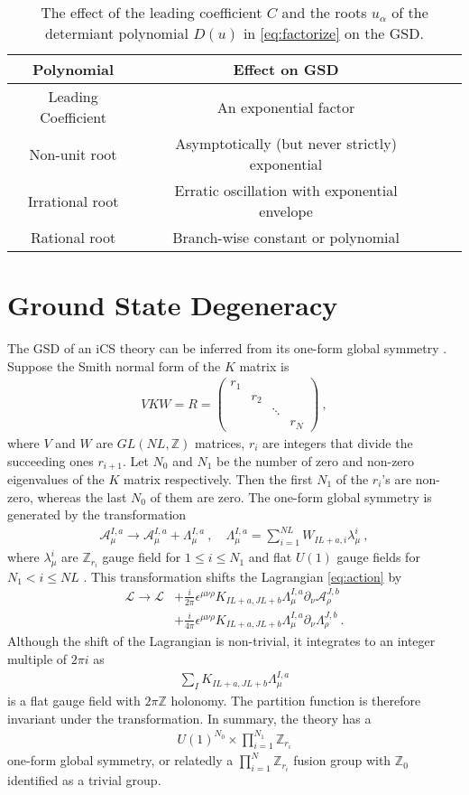 \documentclass[aps,prb,twocolumn,superscriptaddress,floatfix,10pt,nofootinbib]{revtex4-2}
\newcommand{\ie}{\begin{equation}\begin{aligned}}
\newcommand{\fe}{\end{aligned}\end{equation}}
\theoremstyle{definition}
\begin{document}
\begin{table*}
    \centering
    \begin{tabular}{|c|c|c|c|}
        \hline
        Polynomial & Effect on GSD
        \\
        \hline
        Leading Coefficient & An exponential factor
        \\
        \hline
        Non-unit root & Asymptotically (but never strictly) exponential
        \\
        \hline
        Irrational root & Erratic oscillation with exponential envelope 
        \\
        \hline
        Rational root & Branch-wise constant or polynomial
        \\
        \hline
    \end{tabular}
    \caption{The effect of the leading coefficient $C$ and the roots $u_\alpha$ of the determiant polynomial $D(u)$ in \eqref{eq:factorize} on the GSD.}
    \label{tab:GSD_iCS2}
\end{table*}

\section{Ground State Degeneracy}
\label{sec:GSD}
The GSD of an iCS theory can be inferred from its one-form global symmetry \cite{Gaiotto_2015}. Suppose the Smith normal form of the $K$ matrix is
\ie\label{eq:SNF}
VKW=R=\left(\begin{array}{cccccc}
     r_1&  \\
     & r_2 \\
     & & \ddots\\
     & & & r_{N}
\end{array}\right)~,
\fe
where $V$ and $W$ are $GL(NL,\mathbb{Z})$ matrices, $r_i$ are integers that divide the succeeding ones $r_{i+1}$. Let $N_0$ and $N_1$ be the number of zero and non-zero eigenvalues of the $K$ matrix respectively. Then the first $N_1$ of the $r_i$'s are non-zero, whereas the last $N_0$ of them are zero. The one-form global symmetry is generated by the transformation
\ie
\mathcal{A}_\mu^{I,a}\rightarrow \mathcal{A}_\mu^{I,a}+\Lambda_\mu^{I,a}~,\quad \Lambda_\mu^{I,a}=\sum_{i=1}^{NL}  W_{IL+a,i} \lambda_\mu^i~,
\fe
where $\lambda_\mu^i$ are $\mathbb{Z}_{r_i}$ gauge field for $1\leq i\leq N_1$ and flat $U(1)$ gauge fields for $N_1<i\leq NL$ \cite{Chen:2022hbz}. This transformation shifts the Lagrangian \eqref{eq:action} by 
\ie
\mathcal{L}\rightarrow\mathcal{L}&+\frac{i}{2\pi} \epsilon^{\mu\nu\rho} K_{IL+a,JL+b} \Lambda_\mu^{I,a}\partial_\nu \mathcal{A}^{J,b}_\rho
\\
&+\frac{i}{4\pi} \epsilon^{\mu\nu\rho}K_{IL+a,JL+b}\Lambda_\mu^{I,a}\partial_\nu \Lambda_\rho^{J,b}~.
\fe
Although the shift of the Lagrangian is non-trivial, it integrates to an integer multiple of $2\pi i$ as 
\ie
\sum_I K_{IL+a,JL+b} \Lambda_\mu^{I,a}
\fe
is a flat gauge field with $2\pi\mathbb{Z}$ holonomy. The partition function is therefore invariant under the transformation. In summary, the theory has a 
\ie
U(1)^{N_0}\times\prod_{i=1}^{N_1}\mathbb{Z}_{r_i}
\fe
one-form global symmetry, or relatedly a $\prod_{i=1}^{N}\mathbb{Z}_{r_i}$ fusion group with $\mathbb{Z}_0$ identified as a trivial group.
\end{document}
